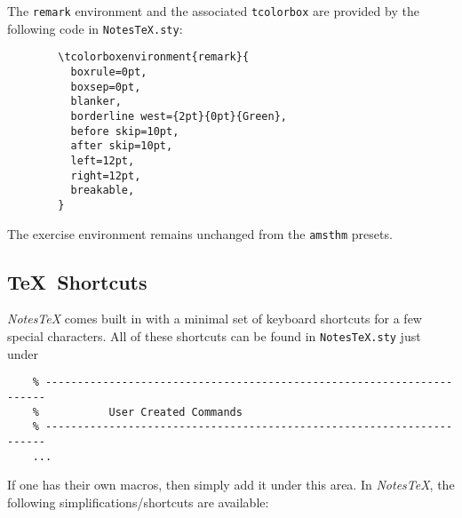 \documentclass[10pt]{article}
\begin{document}
	\begin{remark}
		The \texttt{remark} environment and the associated \texttt{tcolorbox} are provided by the following code in \texttt{NotesTeX.sty}:
		\begin{verbatim}
		\tcolorboxenvironment{remark}{
		  boxrule=0pt,
		  boxsep=0pt,
		  blanker,
		  borderline west={2pt}{0pt}{Green},
		  before skip=10pt,
		  after skip=10pt,
		  left=12pt,
		  right=12pt,
		  breakable,
		}
		\end{verbatim}
	\end{remark}
	\begin{exercise}
		The exercise environment remains unchanged from the \texttt{amsthm} presets.
	\end{exercise}
	
	\newpage
	\subsection{\TeX\ Shortcuts}
	\textit{NotesTeX} comes built in with a minimal set of keyboard shortcuts for a few special characters. All of these shortcuts can be found in \texttt{NotesTeX.sty} just under
	\begin{verbatim}
	% ----------------------------------------------------------------------
	%           User Created Commands
	% ----------------------------------------------------------------------
	...
	\end{verbatim}
	If one has their own macros, then simply add it under this area. In \textit{NotesTeX}, the following simplifications/shortcuts are available:
\end{document}
